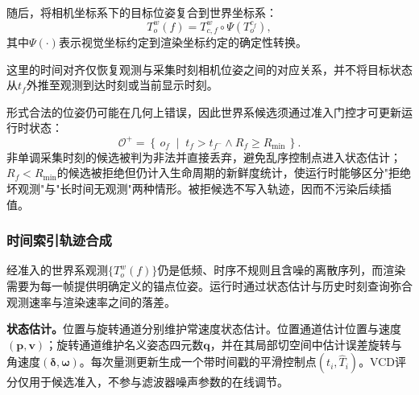 \documentclass[review]{vgtc}
\begin{document}
随后，将相机坐标系下的目标位姿复合到世界坐标系：
\begin{equation}
T_o^w(f)
=
T_{c,f}^{w}
\circ
\Psi\!\left(T_o^{c_f}\right),
\label{eq:spatial-alignment}
\end{equation}
其中$\Psi(\cdot)$表示视觉坐标约定到渲染坐标约定的确定性转换。

这里的时间对齐仅恢复观测与采集时刻相机位姿之间的对应关系，并不将目标状态从$t_f$外推至观测到达时刻或当前显示时刻。

形式合法的位姿仍可能在几何上错误，因此世界系候选须通过准入门控才可更新运行时状态：
\begin{equation}
\mathcal{O}^{+} = \left\{\, o_f \;\middle|\; t_f > t_{f^-} \wedge R_f \geq R_{\min} \,\right\}.
\label{eq:admission}
\end{equation}
非单调采集时刻的候选被判为非法并直接丢弃，避免乱序控制点进入状态估计；$R_f < R_{\min}$的候选被拒绝但仍计入生命周期的新鲜度统计，使运行时能够区分"拒绝坏观测"与"长时间无观测"两种情形。被拒候选不写入轨迹，因而不污染后续插值。

\subsubsection{时间索引轨迹合成}\label{sec:smoothing}

经准入的世界系观测$\{T_o^w(f)\}$仍是低频、时序不规则且含噪的离散序列，而渲染需要为每一帧提供明确定义的锚点位姿。运行时通过状态估计与历史时刻查询弥合观测速率与渲染速率之间的落差。

\textbf{状态估计。}位置与旋转通道分别维护常速度状态估计。位置通道估计位置与速度$(\mathbf{p}, \mathbf{v})$；旋转通道维护名义姿态四元数$\mathbf{q}$，并在其局部切空间中估计误差旋转与角速度$(\boldsymbol{\delta}, \boldsymbol{\omega})$。每次量测更新生成一个带时间戳的平滑控制点$(t_i, \widehat{T}_i)$。VCD评分仅用于候选准入，不参与滤波器噪声参数的在线调节。
\end{document}
